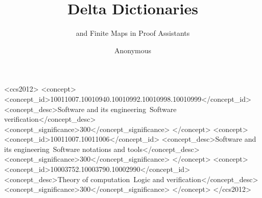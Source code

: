 \documentclass[acmsmall]{acmart} \settopmatter{printfolios=true,printccs=false,printacmref=false}
\begin{document}



\title{Delta Dictionaries}
\subtitle{\total{} and \extensional{} Finite Maps in Proof Assistants}

\author{Anonymous}






\begin{CCSXML}
<ccs2012>
   <concept>
       <concept_id>10011007.10010940.10010992.10010998.10010999</concept_id>
       <concept_desc>Software and its engineering~Software verification</concept_desc>
       <concept_significance>300</concept_significance>
       </concept>
   <concept>
       <concept_id>10011007.10011006</concept_id>
       <concept_desc>Software and its engineering~Software notations and
tools</concept_desc>
       <concept_significance>300</concept_significance>
       </concept>
   <concept>
       <concept_id>10003752.10003790.10002990</concept_id>
       <concept_desc>Theory of computation~Logic and verification</concept_desc>
       <concept_significance>300</concept_significance>
       </concept>
 </ccs2012>
\end{CCSXML}

\end{document}
